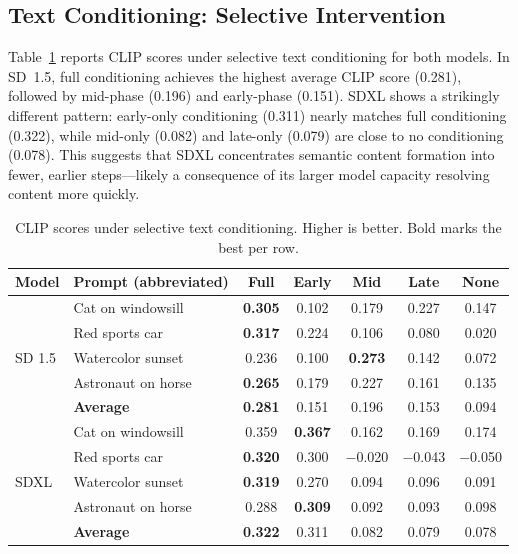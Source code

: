 \documentclass{article}
\begin{document}
\subsection{Text Conditioning: Selective Intervention}

Table~\ref{tab:selective_text} reports CLIP scores under selective text conditioning for both models. In SD~1.5, full conditioning achieves the highest average CLIP score (0.281), followed by mid-phase (0.196) and early-phase (0.151). SDXL shows a strikingly different pattern: early-only conditioning (0.311) nearly matches full conditioning (0.322), while mid-only (0.082) and late-only (0.079) are close to no conditioning (0.078). This suggests that SDXL concentrates semantic content formation into fewer, earlier steps---likely a consequence of its larger model capacity resolving content more quickly.

\begin{table}[t]
\centering
\small
\caption{CLIP scores under selective text conditioning. Higher is better. Bold marks the best per row.}
\label{tab:selective_text}
\vspace{2pt}
\begin{tabular}{@{}llccccc@{}}
\toprule
Model & Prompt (abbreviated) & Full & Early & Mid & Late & None \\
\midrule
\multirow{5}{*}{SD 1.5}
& Cat on windowsill     & \textbf{0.305} & 0.102 & 0.179 & 0.227 & 0.147 \\
& Red sports car        & \textbf{0.317} & 0.224 & 0.106 & 0.080 & 0.020 \\
& Watercolor sunset     & 0.236 & 0.100 & \textbf{0.273} & 0.142 & 0.072 \\
& Astronaut on horse    & \textbf{0.265} & 0.179 & 0.227 & 0.161 & 0.135 \\
\cmidrule{2-7}
& \textbf{Average}      & \textbf{0.281} & 0.151 & 0.196 & 0.153 & 0.094 \\
\midrule
\multirow{5}{*}{SDXL}
& Cat on windowsill     & 0.359 & \textbf{0.367} & 0.162 & 0.169 & 0.174 \\
& Red sports car        & \textbf{0.320} & 0.300 & $-$0.020 & $-$0.043 & $-$0.050 \\
& Watercolor sunset     & \textbf{0.319} & 0.270 & 0.094 & 0.096 & 0.091 \\
& Astronaut on horse    & 0.288 & \textbf{0.309} & 0.092 & 0.093 & 0.098 \\
\cmidrule{2-7}
& \textbf{Average}      & \textbf{0.322} & 0.311 & 0.082 & 0.079 & 0.078 \\
\bottomrule
\end{tabular}
\end{table}
\end{document}
